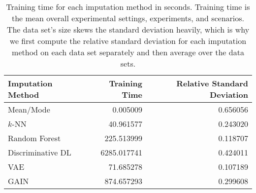 \begin{table}
	\centering
	\label{tab:time}
	\begin{tabular}{lrr}
		\toprule
		Imputation Method &  Training Time &  Relative Standard Deviation \\
		\midrule
		Mean/Mode &       0.005009 &                     0.656056 \\
		$k$-NN &      40.961577 &                     0.243020 \\
		Random Forest &     225.513999 &                     0.118707 \\
		Discriminative DL &    6285.017741 &                     0.424011 \\
		VAE &      71.685278 &                     0.107189 \\
		GAIN &     874.657293 &                     0.299608 \\
		\bottomrule
	\end{tabular}
	\caption{Training time for each imputation method in seconds. Training time is the mean overall experimental settings, experiments, and scenarios. The data set's size skews the standard deviation heavily, which is why we first compute the relative standard deviation for each imputation method on each data set separately and then average over the data sets.}
\end{table}
